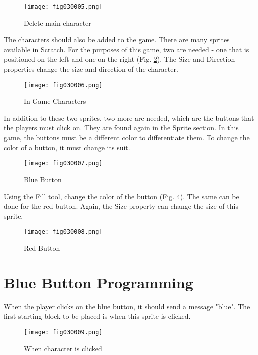 \begin{figure}[H]
   \centering
   \texttt{[image: fig030005.png]}
   \caption{Delete main character}
\label{fig030005}
\end{figure}

The characters should also be added to the game. There are many sprites available in Scratch. For the purposes of this game, two are needed - one that is positioned on the left and one on the right (Fig. \ref{fig030006}). The Size and Direction properties change the size and direction of the character.

\begin{figure}[H]
   \centering
   \texttt{[image: fig030006.png]}
   \caption{In-Game Characters}
\label{fig030006}
\end{figure}

In addition to these two sprites, two more are needed, which are the buttons that the players must click on. They are found again in the Sprite section. In this game, the buttons must be a different color to differentiate them. To change the color of a button, it must change its suit.

\begin{figure}[H]
   \centering
   \texttt{[image: fig030007.png]}
   \caption{Blue Button}
\label{fig030007}
\end{figure}

Using the Fill tool, change the color of the button (Fig. \ref{fig030008}). The same can be done for the red button. Again, the Size property can change the size of this sprite.

\begin{figure}[H]
   \centering
   \texttt{[image: fig030008.png]}
   \caption{Red Button}
\label{fig030008}
\end{figure}

\section{Blue Button Programming}
When the player clicks on the blue button, it should send a message "blue". The first starting block to be placed is when this sprite is clicked.

\begin{figure}[H]
   \centering
   \texttt{[image: fig030009.png]}
   \caption{When character is clicked}
\label{fig030009}
\end{figure}

